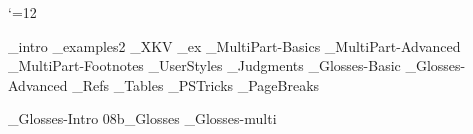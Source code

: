 



 \catcode`\@=12
%







%




_intro
_examples2
_XKV
_ex
_MultiPart-Basics
_MultiPart-Advanced
_MultiPart-Footnotes
_UserStyles
_Judgments
_Glosses-Basic
_Glosses-Advanced
_Refs
_Tables
_PSTricks
_PageBreaks
%
%


\bye
{}_Glosses-Intro
\get 08b_Glosses
_Glosses-multi

